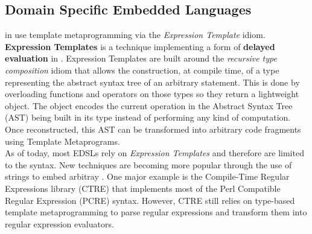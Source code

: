 \documentclass[../../main]{subfiles}
\begin{document}
%



\subsection{
  \cpp Domain Specific Embedded Languages
}

\dsels in \cpp use template metaprogramming via the \textit{Expression
Template} idiom.
\textbf{Expression Templates} \cite{veldhuizen:1995,vandevoorde:2002} is a
technique implementing a
form of \textbf{delayed evaluation} in \cpp \cite{spinellis:2001}. Expression
Templates are built around the \textit{recursive type composition}
idiom \cite{jarvi:1998} that allows the construction, at compile time, of a type
representing the abstract syntax tree of an arbitrary statement. This is done by
overloading functions and operators on those types so they return a lightweight
object. The object encodes the current operation in the Abstract Syntax Tree
(AST) being built in its type instead of performing any kind of computation. Once
reconstructed, this AST can be transformed into arbitrary code fragments using
Template Metaprograms.
\\

As of today, most \cpp EDSLs rely on \textit{Expression Templates} and therefore
are limited to the \cpp syntax. New techniques are becoming more popular through
the use of \constexpr strings to embed arbitray \dsels. One major example is
the Compile-Time Regular Expressions library (CTRE) \cite{ctre} that implements
most of the Perl Compatible Regular Expression (PCRE) syntax. However, CTRE
still relies on type-based template metaprogramming to parse regular expressions
and transform them into regular expression evaluators.


\end{document}
